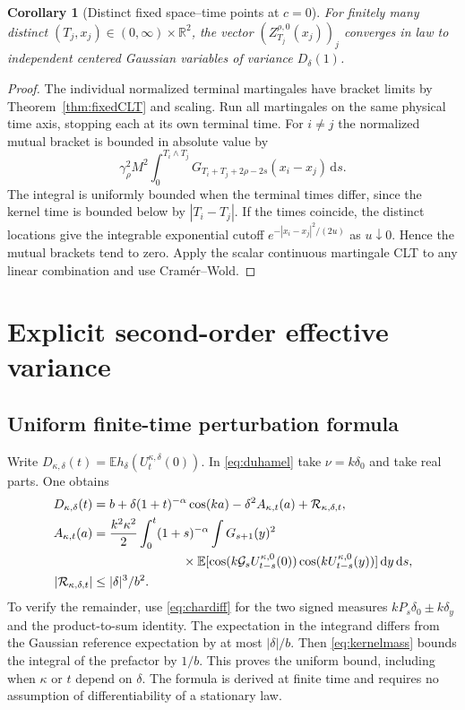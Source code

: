 \documentclass[11pt]{article}
\numberwithin{equation}{section}
\newtheorem{corollary}[theorem]{Corollary}
\theoremstyle{definition}
\theoremstyle{remark}
\newcommand{\R}{\mathbb R}
\newcommand{\E}{\mathbb E}
\newcommand{\clG}{\mathcal G}
\newcommand{\dd}{\,\mathrm d}
\begin{document}
\begin{corollary}[Distinct fixed space--time points at $c=0$]\label{cor:joint}
For finitely many distinct $(T_j,x_j)\in(0,\infty)\times\R^2$, the vector $(Z_{T_j}^{\rho,0}(x_j))_j$ converges in law to independent centered Gaussian variables of variance $D_\delta(1)$.
\end{corollary}
\begin{proof}
The individual normalized terminal martingales have bracket limits by Theorem~\ref{thm:fixedCLT} and scaling. Run all martingales on the same physical time axis, stopping each at its own terminal time. For $i\ne j$ the normalized mutual bracket is bounded in absolute value by
\[
 \gamma_\rho^2 M^2\int_0^{T_i\wedge T_j}
 G_{T_i+T_j+2\rho-2s}(x_i-x_j)\dd s.
\]
The integral is uniformly bounded when the terminal times differ, since the kernel time is bounded below by $|T_i-T_j|$. If the times coincide, the distinct locations give the integrable exponential cutoff $e^{-|x_i-x_j|^2/(2u)}$ as $u\downarrow0$. Hence the mutual brackets tend to zero. Apply the scalar continuous martingale CLT to any linear combination and use Cram\'er--Wold.
\end{proof}

\section{Explicit second-order effective variance}\label{sec:response}
\subsection{Uniform finite-time perturbation formula}
Write $D_{\kappa,\delta}(t)=\E h_\delta(U_t^{\kappa,\delta}(0))$. In \eqref{eq:duhamel} take $\nu=k\delta_0$ and take real parts. One obtains
\begin{align}
 D_{\kappa,\delta}(t)&=b+\delta(1+t)^{-\alpha}\cos(ka)-\delta^2 A_{\kappa,t}(a)+\mathcal R_{\kappa,\delta,t},\label{eq:expansion}\\
 A_{\kappa,t}(a)&=\frac{k^2\kappa^2}{2}\int_0^t(1+s)^{-\alpha}\int G_{s+1}(y)^2\notag\\
 &\hspace{25mm}\times\E[\cos(k\clG_sU_{t-s}^{\kappa,0}(0))\cos(kU_{t-s}^{\kappa,0}(y))]\dd y\dd s,\label{eq:At}\\
 |\mathcal R_{\kappa,\delta,t}|&\le |\delta|^3/b^2.\label{eq:uniformR}
\end{align}
To verify the remainder, use \eqref{eq:chardiff} for the two signed measures $kP_s\delta_0\pm k\delta_y$ and the product-to-sum identity. The expectation in the integrand differs from the Gaussian reference expectation by at most $|\delta|/b$. Then \eqref{eq:kernelmass} bounds the integral of the prefactor by $1/b$. This proves the uniform bound, including when $\kappa$ or $t$ depend on $\delta$. The formula is derived at finite time and requires no assumption of differentiability of a stationary law.
\end{document}
